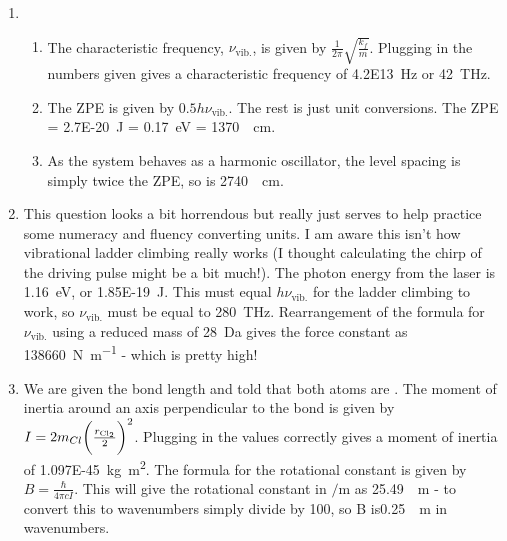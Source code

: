 \documentclass{memoir}[11pt,oneside,a4paper,openany]
\begin{document}
\begin{enumerate}
\begin{enumerate}
		\end{enumerate}
	\item 
		\begin{enumerate}
			\item The characteristic frequency, $\nu_{\text{vib.}}$, is given by $\frac{1}{2\pi}\sqrt{\frac{k_f}{m}}$. Plugging in the numbers given gives a characteristic frequency of \SI{4.2E13}{\hertz} or \SI{42}{\tera\hertz}.
			\item The ZPE is given by $0.5h\nu_{\text{vib.}}$. The rest is just unit conversions. The ZPE = \SI{2.7E-20}{\joule} = \SI{0.17}{\electronvolt} = \SI{1370}{\per\centi\metre}.
			\item As the system behaves as a harmonic oscillator, the level spacing is simply twice the ZPE, so is \SI{2740}{\per\centi\metre}.
		\end{enumerate}
	\item This question looks a bit horrendous but really just serves to help practice some numeracy and fluency converting units. I am aware this isn't how vibrational ladder climbing really works (I thought calculating the chirp of the driving pulse might be a bit much!). The photon energy from the laser is \SI{1.16}{\electronvolt}, or \SI{1.85E-19}{\joule}. This must equal $h\nu_{\text{vib.}}$ for the ladder climbing to work, so $\nu_{\text{vib.}}$ must be equal to \SI{280}{\tera\hertz}. Rearrangement of the formula for $\nu_{\text{vib.}}$ using a reduced mass of \SI{28}{\dalton} gives the force constant as \SI{138660}{\newton\per\metre} - which is pretty high!
	\item We are given the bond length and told that both atoms are . The moment of inertia around an axis perpendicular to the bond is given by $I = 2m_{Cl}\bigg(\frac{r_{\ce{Cl2}}}{2}\bigg)^2$. Plugging in the values correctly gives a moment of inertia of \SI{1.097E-45}{\kg\metre\squared}. The formula for the rotational constant is given by $B = \frac{\hbar}{4\pi cI}$. This will give the rotational constant in $\si{\per\metre}$ as \SI{25.49}{\per\metre} - to convert this to wavenumbers simply divide by 100, so B is\SI{0.25}{\per\metre} in wavenumbers. 
\end{enumerate}
\end{document}
